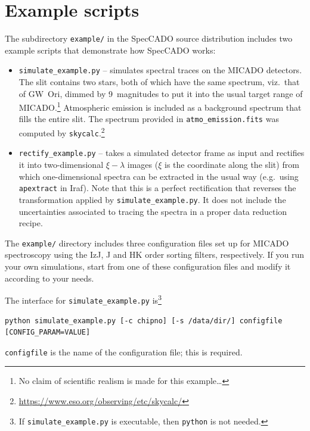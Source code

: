 \documentclass[a4paper,twoside,11pt]{article}
\begin{document}


\section{Example scripts}
\label{sec:examples}

The subdirectory \lstinline{example/} in the SpecCADO source
distribution includes two example scripts that demonstrate how
SpecCADO works:
\begin{itemize}
\item \lstinline{simulate_example.py} -- simulates spectral traces on
  the MICADO detectors. The slit contains two stars, both of which
  have the same spectrum, viz.~that of GW~Ori, dimmed by 9~magnitudes
  to put it into the usual target range of MICADO.\footnote{No claim
    of scientific realism is made for this example\dots} Atmospheric
  emission is included as a background spectrum that fills the entire
  slit. The spectrum provided in \lstinline{atmo_emission.fits} was
  computed by
  \lstinline{skycalc}.\footnote{\url{https://www.eso.org/observing/etc/skycalc/}}
\item \lstinline{rectify_example.py} -- takes a simulated detector
  frame as input and rectifies it into two-dimensional $\xi-\lambda$
  images ($\xi$ is the coordinate along the slit) from which
  one-dimensional spectra can be extracted in the usual way
  (e.g.~using \lstinline{apextract} in Iraf). Note that this is a
  perfect rectification that reverses the transformation applied by
  \lstinline{simulate_example.py}. It does not include the
  uncertainties associated to tracing the spectra in a proper data
  reduction recipe.
\end{itemize}

The \lstinline{example/} directory includes three configuration files
set up for MICADO spectroscopy using the IzJ, J and HK order sorting
filters, respectively. If you run your own simulations, start from one
of these configuration files and modify it according to your needs.

The interface for \lstinline{simulate_example.py} is\footnote{If
  \lstinline{simulate_example.py} is executable, then
  \lstinline{python} is not needed.}
\begin{lstlisting}[style=csh]
python simulate_example.py [-c chipno] [-s /data/dir/] configfile [CONFIG_PARAM=VALUE]
\end{lstlisting}
\lstinline{configfile} is the name of the configuration file; this is
required.
\end{document}
